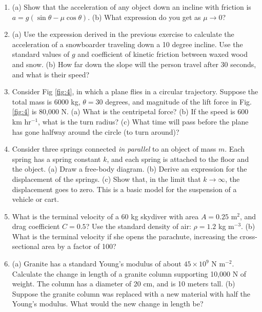 \documentclass[10pt]{article}
\begin{document}
\begin{enumerate}
\item (a) Show that the acceleration of any object down an incline with friction is $a=g(\sin\theta - \mu\cos\theta)$. (b) What expression do you get as $\mu \to 0$? \\ \vspace{2cm}
\item (a) Use the expression derived in the previous exercise to calculate the acceleration of a snowboarder traveling down a 10 degree incline.  Use the standard values of $g$ and coefficient of kinetic friction between waxed wood and snow. (b) How far down the slope will the person travel after 30 seconds, and what is their speed? \\ \vspace{3cm}
\item Consider Fig \ref{fig:4}, in which a plane flies in a circular trajectory. Suppose the total mass is 6000 kg, $\theta = 30$ degrees, and magnitude of the lift force in Fig. \ref{fig:4} is 80,000 N. (a) What is the centripetal force? (b) If the speed is 600 km hr$^{-1}$, what is the turn radius?  (c) What time will pass before the plane has gone halfway around the circle (to turn around)? \\ \vspace{3cm}
\item Consider three springs connected \textit{in parallel} to an object of mass $m$.  Each spring has a spring constant $k$, and each spring is attached to the floor and the object. (a) Draw a free-body diagram. (b) Derive an expression for the displacement of the springs. (c) Show that, in the limit that $k \to \infty$, the displacement goes to zero.  This is a basic model for the suspension of a vehicle or cart. \\ \vspace{3cm}
\item What is the terminal velocity of a 60 kg skydiver with area $A = 0.25$ m$^2$, and drag coefficient $C = 0.5$?  Use the standard density of air: $\rho = 1.2$ kg m$^{-3}$. (b) What is the terminal velocity if she opens the parachute, increasing the cross-sectional area by a factor of 100? \\ \vspace{3cm}
\item (a) Granite has a standard Young’s modulus of about $45 \times 10^9$ N m$^{-2}$. Calculate the change in length of a granite column supporting 10,000 N of weight.  The column has a diameter of 20 cm, and is 10 meters tall. (b) Suppose the granite column was replaced with a new material with half the Young's modulus.  What would the new change in length be? \\ \vspace{2.5cm}
\end{enumerate}
\end{document}
